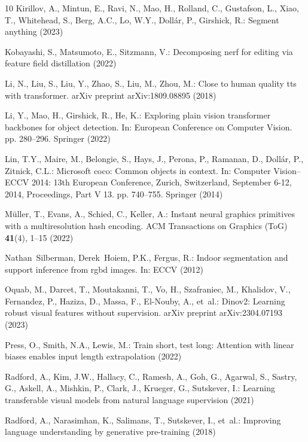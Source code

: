 \documentclass[runningheads]{llncs}
\begin{document}
\begin{thebibliography}{10}
Kirillov, A., Mintun, E., Ravi, N., Mao, H., Rolland, C., Gustafson, L., Xiao, T., Whitehead, S., Berg, A.C., Lo, W.Y., Dollár, P., Girshick, R.: Segment anything (2023)

Kobayashi, S., Matsumoto, E., Sitzmann, V.: Decomposing nerf for editing via feature field distillation (2022)

Li, N., Liu, S., Liu, Y., Zhao, S., Liu, M., Zhou, M.: Close to human quality tts with transformer. arXiv preprint arXiv:1809.08895  (2018)

Li, Y., Mao, H., Girshick, R., He, K.: Exploring plain vision transformer backbones for object detection. In: European Conference on Computer Vision. pp. 280--296. Springer (2022)

Lin, T.Y., Maire, M., Belongie, S., Hays, J., Perona, P., Ramanan, D., Doll{\'a}r, P., Zitnick, C.L.: Microsoft coco: Common objects in context. In: Computer Vision--ECCV 2014: 13th European Conference, Zurich, Switzerland, September 6-12, 2014, Proceedings, Part V 13. pp. 740--755. Springer (2014)

M{\"u}ller, T., Evans, A., Schied, C., Keller, A.: Instant neural graphics primitives with a multiresolution hash encoding. ACM Transactions on Graphics (ToG)  \textbf{41}(4),  1--15 (2022)

Nathan~Silberman, Derek~Hoiem, P.K., Fergus, R.: Indoor segmentation and support inference from rgbd images. In: ECCV (2012)

Oquab, M., Darcet, T., Moutakanni, T., Vo, H., Szafraniec, M., Khalidov, V., Fernandez, P., Haziza, D., Massa, F., El-Nouby, A., et~al.: Dinov2: Learning robust visual features without supervision. arXiv preprint arXiv:2304.07193  (2023)

Press, O., Smith, N.A., Lewis, M.: Train short, test long: Attention with linear biases enables input length extrapolation (2022)

Radford, A., Kim, J.W., Hallacy, C., Ramesh, A., Goh, G., Agarwal, S., Sastry, G., Askell, A., Mishkin, P., Clark, J., Krueger, G., Sutskever, I.: Learning transferable visual models from natural language supervision (2021)

Radford, A., Narasimhan, K., Salimans, T., Sutskever, I., et~al.: Improving language understanding by generative pre-training  (2018)


\end{thebibliography}
\end{document}
